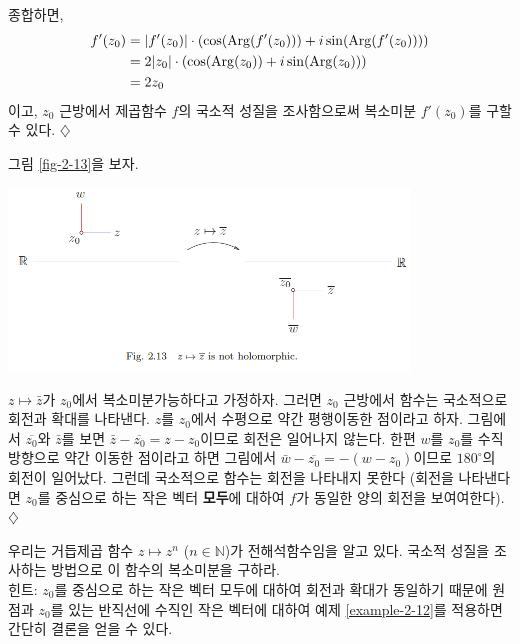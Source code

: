 \begin{saltexample}{}{}
종합하면,
\begin{align*}
f'(z_0) &= |f'(z_0)| \cdot
\left( \cos(\mathop{\mathrm{Arg}}(f'(z_0))) + i \sin(\mathop{\mathrm{Arg}}(f'(z_0))) \right) \\
&= 2|z_0|\cdot \left(\cos(\mathop{\mathrm{Arg}}(z_0)) + i \sin(\mathop{\mathrm{Arg}}(z_0)) \right) \\
&= 2z_0
\end{align*}
이고,
$z_0$ 근방에서 제곱함수 $f$의 국소적 성질을 조사함으로써
복소미분 $f'(z_0)$를 구할 수 있다.
\hfill $\diamondsuit$
\end{saltexample}

\begin{saltexample}{}{}
\label{example-2-13}
그림 \ref{fig-2-13}을 보자.

\begin{center}
\includegraphics[width=0.8\textwidth]{./SaltChapter/fig-2-13}
\end{center}
\label{fig-2-13}

$z\mapsto \bar z$가 $z_0$에서 복소미분가능하다고 가정하자.
그러면 $z_0$ 근방에서 함수는 국소적으로 회전과 확대를 나타낸다.
$z$를 $z_0$에서 수평으로 약간 평행이동한 점이라고 하자.
그림에서 $\overline{z_0}$와 $\bar z$를 보면
$\bar z - \overline{z_0} = z-z_0$이므로 회전은 일어나지 않는다.
한편 $w$를 $z_0$를 수직방향으로 약간 이동한 점이라고 하면
그림에서 $\bar w - \overline{z_0} =  - (w-z_0)$이므로
$180^\circ$의 회전이 일어났다.
그런데 국소적으로 함수는 회전을 나타내지 못한다
(회전을 나타낸다면 $z_0$를 중심으로 하는  작은 벡터 {\bf 모두}에 대하여 
$f$가 동일한 양의 회전을 보여여한다).
\hfill $\diamondsuit$
\end{saltexample}

\begin{salt_exercise}\label{ex-2-16}
우리는 거듭제곱 함수 $z\mapsto z^n$ ($n\in\mathbb N$)가 전해석함수임을 알고 있다.
국소적 성질을 조사하는 방법으로 이 함수의 복소미분을 구하라. \\[1ex]
힌트:  $z_0$를 중심으로 하는  작은 벡터 모두에 대하여
회전과 확대가 동일하기 때문에
원점과 $z_0$를 있는 반직선에 수직인 작은 벡터에 대하여 
예제 \ref{example-2-12}를 적용하면 간단히 결론을 얻을 수 있다.
\end{salt_exercise}

